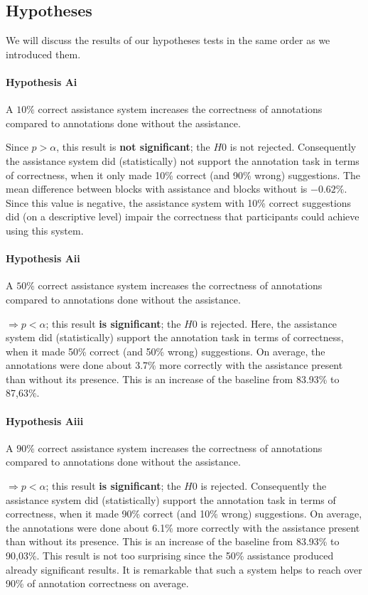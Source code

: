 \subsection{Hypotheses}
	We will discuss the results of our hypotheses tests in the same order as we introduced them.

	\paragraph{Hypothesis Ai}
	\lqq A \(10\%\) correct assistance system increases the correctness of annotations compared to annotations done without the assistance.\rqq

	Since \(p > \alpha\), this result is \textbf{not significant}; the $H0$ is not rejected.
	Consequently the assistance system did (statistically) not support the annotation task in terms of correctness, when it only made 10\% correct (and 90\% wrong) suggestions. The mean difference between blocks with assistance and blocks without is $-0.62\%$. Since this value is negative, the assistance system with 10\% correct suggestions did (on a descriptive level) impair the correctness that participants could achieve using this system.

	\paragraph{Hypothesis Aii}
	\lqq A \(50\%\) correct assistance system increases the correctness of annotations compared to annotations done without the assistance.\rqq

	\(\Rightarrow p < \alpha\); this result \textbf{is significant}; the $H0$ is rejected.
	Here, the assistance system did (statistically) support the annotation task in terms of correctness, when it made 50\% correct (and 50\% wrong) suggestions. On average, the annotations were done about 3.7\% more correctly with the assistance present than without its presence. This is an increase of the baseline from 83.93\% to 87,63\%.

	\paragraph{Hypothesis Aiii}
	\lqq A \(90\%\) correct assistance system increases the correctness of annotations compared to annotations done without the assistance.\rqq

	\(\Rightarrow p < \alpha\); this result \textbf{is significant}; the $H0$ is rejected.
	Consequently the assistance system did (statistically) support the annotation task in terms of correctness, when it made 90\% correct (and 10\% wrong) suggestions. On average, the annotations were done about 6.1\% more correctly with the assistance present than without its presence. This is an increase of the baseline from 83.93\% to 90,03\%. This result is not too surprising since the 50\% assistance produced already significant results. It is remarkable that such a system helps to reach over 90\% of annotation correctness on average.



